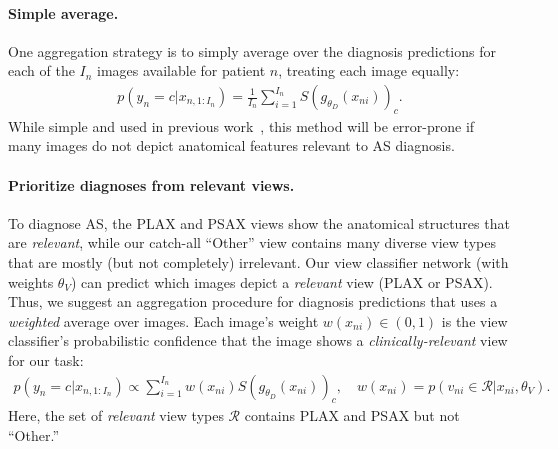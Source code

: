 
\paragraph{Simple average.} One aggregation strategy is to simply average over the diagnosis predictions for each of the $I_n$ images available for patient $n$, treating each image equally:
\begin{align}
p(y_n = c | x_{n,1:I_n} ) = 
	 \frac{1}{I_n}
	 \sum_{i=1}^{I_n} S(g_{\theta_D}(x_{ni}))_c.
\end{align}
While simple and used in previous work~\citep{ghorbaniDeepLearningInterpretation2020}, this method will be error-prone if many images do not depict anatomical features relevant to AS diagnosis.

\paragraph{Prioritize diagnoses from relevant views.}
To diagnose AS, the PLAX and PSAX views show the anatomical structures that are \emph{relevant}, while our catch-all ``Other'' view  contains many diverse view types that are mostly (but not completely) irrelevant.
Our view classifier network (with weights $\theta_V$) can predict which images depict a \emph{relevant} view (PLAX or PSAX).
Thus, we suggest an aggregation procedure for diagnosis predictions that uses a \emph{weighted} average over images.
Each image's weight $w(x_{ni}) \in (0,1)$ is the view classifier's probabilistic confidence that the image shows a \emph{clinically-relevant} view for our task:
\begin{align}
p(y_n = c | x_{n,1:I_n} ) \propto
\sum_{i=1}^{I_n} w(x_{ni}) S(g_{\theta_D}(x_{ni}))_c, \quad w(x_{ni}) = p( v_{ni} \in \mathcal{R} | x_{ni}, \theta_V).
\end{align}
Here, the set of \emph{relevant} view types $\mathcal{R}$ contains PLAX and PSAX but not ``Other.''


